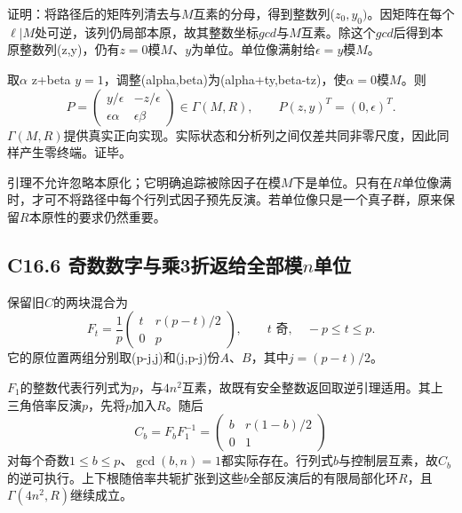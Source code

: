 {证明：将路径后的矩阵列清去与\ensuremath{M}互素的分母，得到整数列(\ensuremath{z_{0},y_{0})}。因矩阵在每个\ensuremath{\ell |M}处可逆，该列仍局部本原，故其整数坐标\ensuremath{gcd}与\ensuremath{M}互素。除这个\ensuremath{gcd}后得到本原整数列(z,y)，仍有\ensuremath{z=0}模\ensuremath{M}、\ensuremath{y}为单位。单位像满射给\ensuremath{\epsilon =y}模\ensuremath{M}。}

{取\ensuremath{\alpha }} {z+beta} {\ensuremath{y=1}，调整(alpha,beta)为(alpha+ty,beta-tz)，使\ensuremath{\alpha =0}模\ensuremath{M}。则} \[
P=\begin{pmatrix}
y/\epsilon&-z/\epsilon\\
\epsilon\alpha&\epsilon\beta
\end{pmatrix}
\in\Gamma(M,R),\qquad
P(z,y)^T=(0,\epsilon)^T.
\tag{C16.5.1}
\] {\ensuremath{\Gamma (M,R)}提供真实正向实现。实际状态和分析列之间仅差共同非零尺度，因此同样产生零终端。证毕。}

{引理不允许忽略本原化；它明确追踪被除因子在模\ensuremath{M}下是单位。只有在\ensuremath{R}单位像满时，才可不将路径中每个行列式因子预先反演。若单位像只是一个真子群，原来保留\ensuremath{R}本原性的要求仍然重要。}

\subsection*{\texorpdfstring{{C16.6} {奇数数字与乘3折返给全部模\ensuremath{n}单位}}{C16.6 奇数数字与乘3折返给全部模单位}}\label{C16-h118}

{保留旧\ensuremath{C}的两块混合为} \[
F_t=\frac1p
\begin{pmatrix}
t&r(p-t)/2\\0&p
\end{pmatrix},
\qquad t\text{ 奇},\quad -p\le t\le p.
\tag{C16.6.1}
\] {它的原位置两组分别取(p-j,j)和(j,p-j)份\ensuremath{A}、\ensuremath{B}，其中\ensuremath{j=(p-t)/2}。}

{\ensuremath{F_{1}}的整数代表行列式为\ensuremath{p}，与\ensuremath{4n^{2}}互素，故既有安全整数返回取逆引理适用。其上三角倍率反演\ensuremath{p}，先将\ensuremath{p}加入\ensuremath{R}。随后} \[
C_b=F_bF_1^{-1}
=\begin{pmatrix}b&r(1-b)/2\\0&1\end{pmatrix}
\] {对每个奇数\ensuremath{1\le b\le p}、\ensuremath{\operatorname{gcd}(b,n)=1}都实际存在。行列式\ensuremath{b}与控制层互素，故\ensuremath{C_{b}}的逆可执行。上下根随倍率共轭扩张到这些\ensuremath{b}全部反演后的有限局部化环\ensuremath{R}，且\ensuremath{\Gamma (4n^{2},R)}继续成立。}

